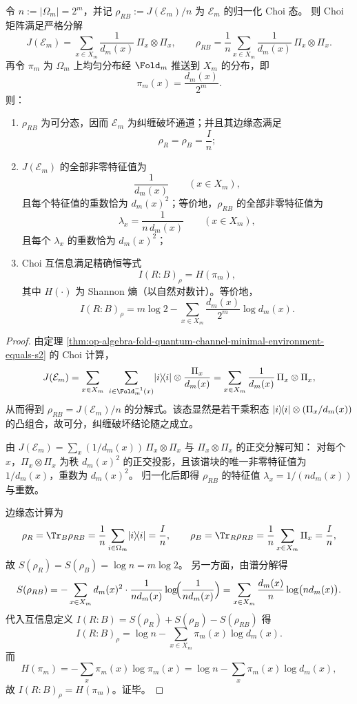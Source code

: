 \begin{theorem}\label{thm:op-algebra-fold-quantum-channel-choi-spectrum-mi}
令 \(n:=|\Omega_m|=2^m\)，并记 \(\rho_{RB}:=J(\mathcal{E}_m)/n\) 为 \(\mathcal{E}_m\) 的归一化 Choi 态。
则 Choi 矩阵满足严格分解
\[
J(\mathcal{E}_m)=\sum_{x\in X_m}\frac{1}{d_m(x)}\,\Pi_x\otimes \Pi_x,
\qquad
\rho_{RB}=\frac{1}{n}\sum_{x\in X_m}\frac{1}{d_m(x)}\,\Pi_x\otimes \Pi_x.
\]
再令 \(\pi_m\) 为 \(\Omega_m\) 上均匀分布经 \(\Fold_m\) 推送到 \(X_m\) 的分布，即
\[
\pi_m(x)=\frac{d_m(x)}{2^m}.
\]
则：
\begin{enumerate}
  \item \(\rho_{RB}\) 为可分态，因而 \(\mathcal{E}_m\) 为纠缠破坏通道；并且其边缘态满足
  \[
  \rho_R=\rho_B=\frac{I}{n};
  \]
  \item \(J(\mathcal{E}_m)\) 的全部非零特征值为
  \[
  \frac{1}{d_m(x)}\qquad (x\in X_m),
  \]
  且每个特征值的重数恰为 \(d_m(x)^2\)；等价地，\(\rho_{RB}\) 的全部非零特征值为
  \[
  \lambda_x=\frac{1}{n\,d_m(x)}\qquad (x\in X_m),
  \]
  且每个 \(\lambda_x\) 的重数恰为 \(d_m(x)^2\)；
  \item Choi 互信息满足精确恒等式
  \[
  I(R\!:\!B)_{\rho}=H(\pi_m),
  \]
  其中 \(H(\cdot)\) 为 Shannon 熵（以自然对数计）。等价地，
  \[
  I(R\!:\!B)_{\rho}=m\log 2-\sum_{x\in X_m}\frac{d_m(x)}{2^m}\log d_m(x).
  \]
\end{enumerate}
\end{theorem}
\begin{proof}
由定理 \ref{thm:op-algebra-fold-quantum-channel-minimal-environment-equals-s2} 的 Choi 计算，
\[
J(\mathcal{E}_m)
=\sum_{x\in X_m}\ \sum_{i\in\Fold_m^{-1}(x)} \ket{i}\!\bra{i}\otimes \frac{\Pi_x}{d_m(x)}
=\sum_{x\in X_m}\frac{1}{d_m(x)}\,\Pi_x\otimes \Pi_x,
\]
从而得到 \(\rho_{RB}=J(\mathcal{E}_m)/n\) 的分解式。该态显然是若干乘积态 \(\lvert i\rangle\!\langle i\rvert\otimes(\Pi_x/d_m(x))\) 的凸组合，故可分，纠缠破坏结论随之成立。

由
\(
J(\mathcal{E}_m)=\sum_x (1/d_m(x))\,\Pi_x\otimes\Pi_x
\)
与 \(\Pi_x\otimes\Pi_x\) 的正交分解可知：
对每个 \(x\)，\(\Pi_x\otimes\Pi_x\) 为秩 \(d_m(x)^2\) 的正交投影，且该谱块的唯一非零特征值为 \(1/d_m(x)\)，重数为 \(d_m(x)^2\)。
归一化后即得 \(\rho_{RB}\) 的特征值 \(\lambda_x=1/(n d_m(x))\) 与重数。

边缘态计算为
\[
\rho_R=\Tr_B\rho_{RB}=\frac{1}{n}\sum_{i\in\Omega_m}\ket{i}\!\bra{i}=\frac{I}{n},
\qquad
\rho_B=\Tr_R\rho_{RB}=\frac{1}{n}\sum_{x\in X_m}\Pi_x=\frac{I}{n},
\]
故 \(S(\rho_R)=S(\rho_B)=\log n=m\log 2\)。
另一方面，由谱分解得
\[
S(\rho_{RB})
=-\sum_{x\in X_m} d_m(x)^2\cdot \frac{1}{n d_m(x)}\log\!\Bigl(\frac{1}{n d_m(x)}\Bigr)
=\sum_{x\in X_m}\frac{d_m(x)}{n}\log\bigl(n d_m(x)\bigr).
\]
代入互信息定义 \(I(R\!:\!B)=S(\rho_R)+S(\rho_B)-S(\rho_{RB})\) 得
\[
I(R\!:\!B)_{\rho}
=\log n-\sum_{x\in X_m}\pi_m(x)\log d_m(x).
\]
而
\[
H(\pi_m)=-\sum_x \pi_m(x)\log \pi_m(x)
=\log n-\sum_x \pi_m(x)\log d_m(x),
\]
故 \(I(R\!:\!B)_{\rho}=H(\pi_m)\)。证毕。
\end{proof}

